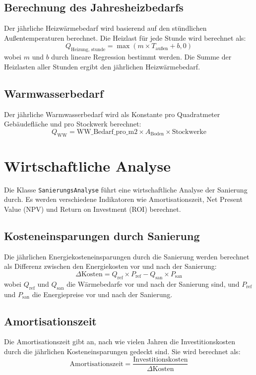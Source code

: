 \subsection{Berechnung des Jahresheizbedarfs}
Der jährliche Heizwärmebedarf wird basierend auf den stündlichen Außentemperaturen berechnet. Die Heizlast für jede Stunde wird berechnet als:
\[
Q_{\text{Heizung, stunde}} = \max(m \times T_{\text{außen}} + b, 0)
\]
wobei \( m \) und \( b \) durch lineare Regression bestimmt werden. Die Summe der Heizlasten aller Stunden ergibt den jährlichen Heizwärmebedarf.

\subsection{Warmwasserbedarf}
Der jährliche Warmwasserbedarf wird als Konstante pro Quadratmeter Gebäudefläche und pro Stockwerk berechnet:
\[
Q_{\text{WW}} = \text{WW\_Bedarf\_pro\_m2} \times A_{\text{Boden}} \times \text{Stockwerke}
\]

\section{Wirtschaftliche Analyse}
Die Klasse \texttt{SanierungsAnalyse} führt eine wirtschaftliche Analyse der Sanierung durch. Es werden verschiedene Indikatoren wie Amortisationszeit, Net Present Value (NPV) und Return on Investment (ROI) berechnet.

\subsection{Kosteneinsparungen durch Sanierung}
Die jährlichen Energiekosteneinsparungen durch die Sanierung werden berechnet als Differenz zwischen den Energiekosten vor und nach der Sanierung:
\[
\Delta \text{Kosten} = Q_{\text{ref}} \times P_{\text{ref}} - Q_{\text{san}} \times P_{\text{san}}
\]
wobei \( Q_{\text{ref}} \) und \( Q_{\text{san}} \) die Wärmebedarfe vor und nach der Sanierung sind, und \( P_{\text{ref}} \) und \( P_{\text{san}} \) die Energiepreise vor und nach der Sanierung.

\subsection{Amortisationszeit}
Die Amortisationszeit gibt an, nach wie vielen Jahren die Investitionskosten durch die jährlichen Kosteneinsparungen gedeckt sind. Sie wird berechnet als:
\[
\text{Amortisationszeit} = \frac{\text{Investitionskosten}}{\Delta \text{Kosten}}
\]

